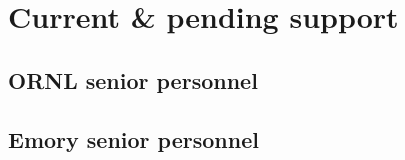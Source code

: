
\section{Current \& pending support}
\label{sec:current--pending}

\subsection{ORNL senior personnel}







\subsection{Emory senior personnel}




\pagebreak
\endinput


